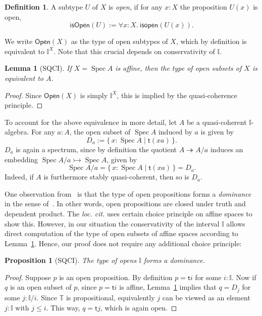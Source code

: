 \documentclass[12pt]{amsart}
\newtheorem{lemma}[theorem]{Lemma}
\newtheorem{proposition}[theorem]{Proposition}
\theoremstyle{definition}
\newtheorem{definition}[theorem]{Definition}
\newcommand{\mbb}[1]{\mathbb{#1}}
\newcommand{\T}{\mbb T}
\newcommand{\I}{\mbb I}
\newcommand{\ms}[1]{\mathsf{#1}}
\newcommand{\scomp}[2]{\{\,#1\mid#2\,\}}
\newcommand{\surj}{\twoheadrightarrow}
\newcommand{\inj}{\rightarrowtail}
\newcommand{\fa}[2]{\forall #1\!\colon\!\!#2.\ }
\newcommand{\spec}{\operatorname{Spec}}
\begin{document}
\begin{definition}
  A subtype $U$ of $X$ is \emph{open}, if for any $x:X$ the proposition $U(x)$ is open,
  \[ \ms{isOpen}(U) := \fa xX \ms{isopen}(U(x)). \]
\end{definition}

We write $\ms{Open}(X)$ as the type of open subtypes of $X$, which by definition is equivalent to $\I^X$. Note that this crucial depends on conservativity of $\I$.

\begin{lemma}[SQCI]\label{lem:openofaffinegivesalgebra}
  If $X = \spec A$ is affine, then the type of open subsets of $X$ is equivalent to $A$.
\end{lemma}
\begin{proof}
  Since $\ms{Open}(X)$ is simply $\I^X$, this is implied by the quasi-coherence principle.
\end{proof}

To account for the above equivalence in more detail, let $A$ be a quasi-coherent $\I$-algebra. For any $a : A$, the open subset of $\spec A$ induced by $a$ is given by
\[ D_a := \scomp{x : \spec A}{\ms t(xa)}. \]
$D_a$ is again a spectrum, since by definition the quotient $A \surj A/a$ induces an embedding $\spec A/a \inj \spec A$, given by
\[ \spec A/a = \scomp{x : \spec A}{\ms t(xa)} = D_a. \]
Indeed, if $A$ is furthermore stably quasi-coherent, then so is $D_a$.

One observation from~\cite{Cherubini_Coquand_Hutzler_2024} is that the type of open propositions forms a \emph{dominance} in the sense of~\cite{rosolini1986continuity}. In other words, open propositions are closed under truth and dependent product. The \emph{loc. cit.} uses certain choice principle on affine spaces to show this. However, in our situation the conservativity of the interval $\I$ allows direct computation of the type of open subsets of affine spaces according to Lemma~\ref{lem:openofaffinegivesalgebra}. Hence, our proof does not require any additional choice principle:

\begin{proposition}[SQCI]\label{prop:Idominance}
  The type of opens $\I$ forms a dominance.
\end{proposition}
\begin{proof}
  Suppose $p$ is an open proposition. By definition $p = \ms ti$ for some $i:\I$. Now if $q$ is an open subset of $p$, since $p = \ms ti$ is affine, Lemma~\ref{lem:openofaffinegivesalgebra} implies that $q = D_j$ for some $j : \I/i$. Since $\T$ is propositional, equivalently $j$ can be viewed as an element $j : \I$ with $j \le i$. This way, $q = \ms tj$, which is again open.
\end{proof}
\end{document}
